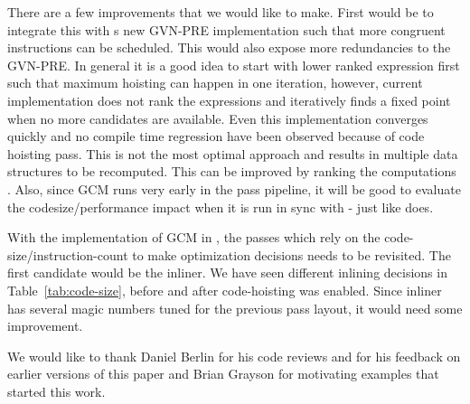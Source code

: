 \documentclass[acmlarge,review,anonymous]{acmart}\settopmatter{printfolios=true}
\begin{document}
There are a few improvements that we would like to make. First would be to
integrate this with s new GVN-PRE implementation such that more
congruent instructions can be scheduled. This would also expose more
redundancies to the GVN-PRE.  In general it is a good idea to start with lower
ranked expression first such that maximum hoisting can happen in one iteration,
however, current implementation does not rank the expressions and iteratively
finds a fixed point when no more candidates are available. Even this
implementation converges quickly and no compile time regression have been
observed because of code hoisting pass. This is not the most optimal approach
and results in multiple data structures to be recomputed. This can be improved
by ranking the computations \cite{rosen1988global}. Also, since GCM runs very
early in the pass pipeline, it will be good to evaluate the codesize/performance
impact when it is run in sync with \GVN{}-\PRE{} just like \GCC{} does.

With the implementation of GCM in \LLVM{}, the passes which rely on the
code-size/instruction-count to make optimization decisions needs to be
revisited. The first candidate would be the inliner. We have seen different
inlining decisions in Table~\ref{tab:code-size}, before and after code-hoisting
was enabled.  Since inliner has several magic numbers tuned for the previous
pass layout, it would need some improvement.

\begin{acks}                            %
We would like to thank Daniel Berlin for his code reviews and for his feedback
on earlier versions of this paper and Brian Grayson for motivating examples that
started this work.
\end{acks}




\end{document}
